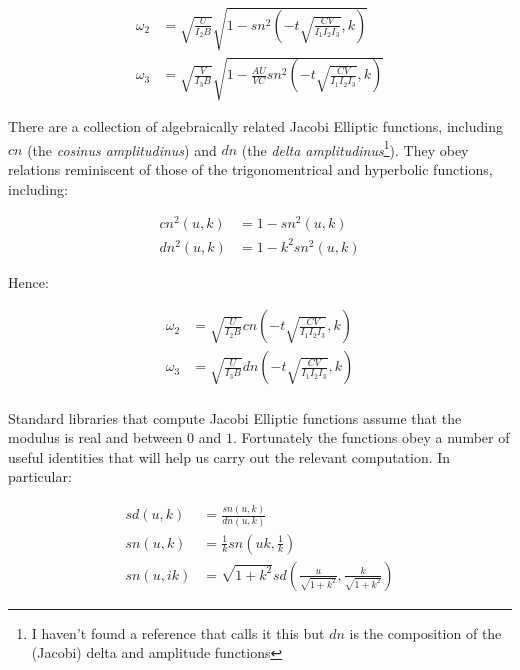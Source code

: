 \documentclass[a4paper, 12pt]{article}
\begin{document}
\begin{align}
  \omega_2 &=\sqrt{\frac{U}{I_2B}}\sqrt{1 - sn^2(-t\sqrt{\frac{CV}{I_1I_2I_3}}, k)} \\
  \omega_3 &=\sqrt{\frac{V}{I_3B}}\sqrt{1 - \frac{AU}{VC}sn^2(-t\sqrt{\frac{CV}{I_1I_2I_3}}, k)}
\end{align}

There are a collection of algebraically related Jacobi Elliptic functions, including $cn$ (the {\it cosinus amplitudinus}) and $dn$ (the {\it delta amplitudinus}\footnote{I haven't found a reference that calls it this but $dn$ is the composition of the (Jacobi) delta and amplitude functions}). They obey relations reminiscent of those of the trigonomentrical and hyperbolic functions, including:

\begin{align}
  cn^2(u, k) &= 1 - sn^2(u, k) \\
  dn^2(u, k) &= 1 - k^2sn^2(u, k)
\end{align}

Hence:

\begin{align}
  \omega_2 &=\sqrt{\frac{U}{I_2B}}cn(-t\sqrt{\frac{CV}{I_1I_2I_3}}, k) \\
  \omega_3 &=\sqrt{\frac{U}{I_3B}}dn(-t\sqrt{\frac{CV}{I_1I_2I_3}}, k) \\
\end{align}

Standard libraries that compute Jacobi Elliptic functions assume that the modulus is real and between $0$ and $1$. Fortunately the functions obey a number of useful identities that will help us carry out the relevant computation. In particular:

\begin{align}
  sd(u, k) &= \frac{sn(u, k)}{dn(u, k)} \\
  sn(u, k) &= \frac{1}{k}sn( uk, \frac{1}{k}) \\
  sn(u, ik) &= \sqrt{1 + k^2} sd(\frac{u}{\sqrt{1 + k^2}}, \frac{k}{\sqrt{1+k^2}})
\end{align}



\end{document}
